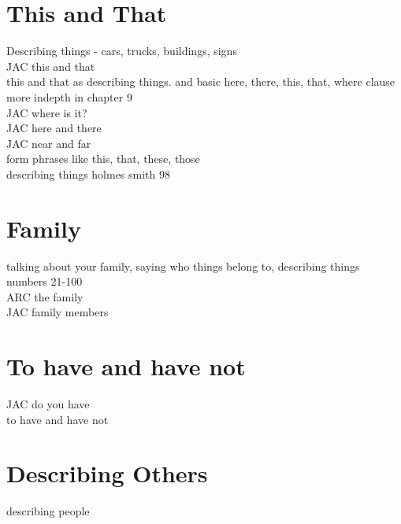 \chapter{This and That}
Describing things - cars, trucks, buildings, signs\\
JAC this and that\\
this and that as describing things.  and basic here, there, this, that, where clause\\
more indepth in chapter 9\\
JAC where is it?\\
JAC here and there\\
JAC near and far\\
form phrases like this, that, these, those\\
describing things holmes smith 98\\
\chapter{Family}
talking about your family, saying who things belong to, describing things\\
numbers 21-100\\
ARC the family\\
JAC family members\\
\chapter{To have and have not}
JAC do you have\\
to have and have not\\
\chapter{Describing Others}
describing people\\
